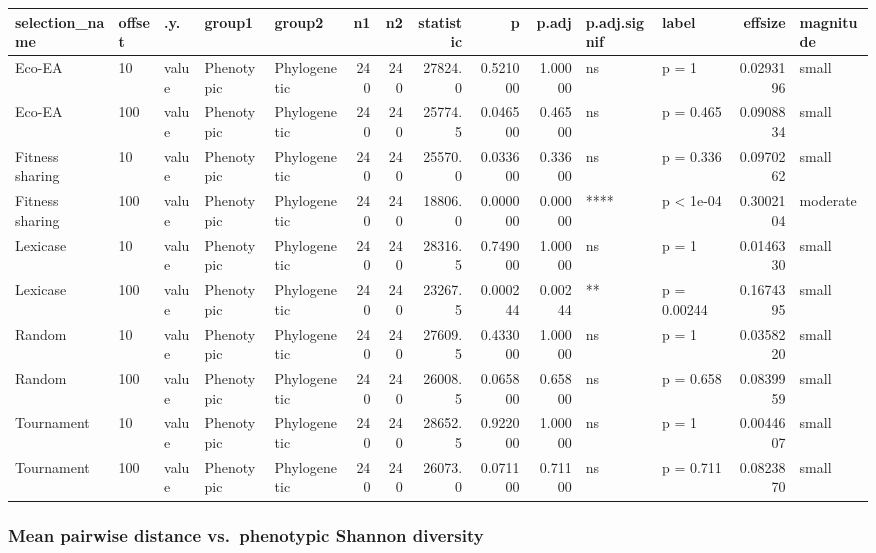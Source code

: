 \documentclass[]{book}
\begin{document}
\begin{table}
\centering
\begin{tabular}[t]{l|l|l|l|l|r|r|r|r|r|l|l|r|l}
\hline
selection\_name & offset & .y. & group1 & group2 & n1 & n2 & statistic & p & p.adj & p.adj.signif & label & effsize & magnitude\\
\hline
Eco-EA & 10 & value & Phenotypic & Phylogenetic & 240 & 240 & 27824.0 & 0.521000 & 1.00000 & ns & p = 1 & 0.0293196 & small\\
\hline
Eco-EA & 100 & value & Phenotypic & Phylogenetic & 240 & 240 & 25774.5 & 0.046500 & 0.46500 & ns & p = 0.465 & 0.0908834 & small\\
\hline
Fitness sharing & 10 & value & Phenotypic & Phylogenetic & 240 & 240 & 25570.0 & 0.033600 & 0.33600 & ns & p = 0.336 & 0.0970262 & small\\
\hline
Fitness sharing & 100 & value & Phenotypic & Phylogenetic & 240 & 240 & 18806.0 & 0.000000 & 0.00000 & **** & p < 1e-04 & 0.3002104 & moderate\\
\hline
Lexicase & 10 & value & Phenotypic & Phylogenetic & 240 & 240 & 28316.5 & 0.749000 & 1.00000 & ns & p = 1 & 0.0146330 & small\\
\hline
Lexicase & 100 & value & Phenotypic & Phylogenetic & 240 & 240 & 23267.5 & 0.000244 & 0.00244 & ** & p = 0.00244 & 0.1674395 & small\\
\hline
Random & 10 & value & Phenotypic & Phylogenetic & 240 & 240 & 27609.5 & 0.433000 & 1.00000 & ns & p = 1 & 0.0358220 & small\\
\hline
Random & 100 & value & Phenotypic & Phylogenetic & 240 & 240 & 26008.5 & 0.065800 & 0.65800 & ns & p = 0.658 & 0.0839959 & small\\
\hline
Tournament & 10 & value & Phenotypic & Phylogenetic & 240 & 240 & 28652.5 & 0.922000 & 1.00000 & ns & p = 1 & 0.0044607 & small\\
\hline
Tournament & 100 & value & Phenotypic & Phylogenetic & 240 & 240 & 26073.0 & 0.071100 & 0.71100 & ns & p = 0.711 & 0.0823870 & small\\
\hline
\end{tabular}
\end{table}

\hypertarget{mean-pairwise-distance-vs.phenotypic-shannon-diversity}{%
\subsubsection{Mean pairwise distance vs.~phenotypic Shannon diversity}\label{mean-pairwise-distance-vs.phenotypic-shannon-diversity}}
\end{document}
